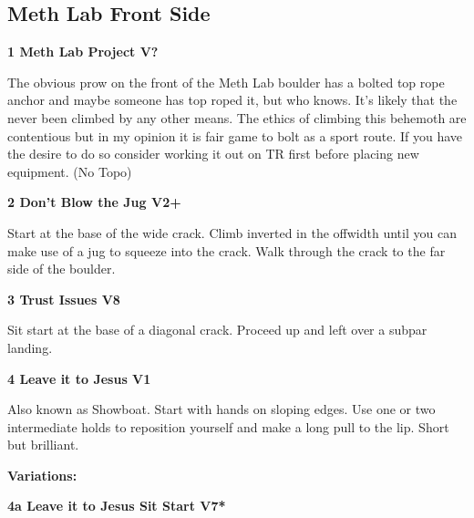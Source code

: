 \begin{multicols}{2}
	

			\subsection*{Meth Lab Front Side}\label{bf:Meth Lab Front Side}
						
					\label{rt:Meth Lab Project}
\colorbox{black!20}{
\parbox{0.95\linewidth}{
\textbf{
1 Meth Lab Project V?  \warn\warn\warn
}
}
}

					\begin{adjustwidth}{0.5cm}{}				
					The obvious prow on the front of the Meth Lab boulder has a bolted top rope anchor and maybe someone has top roped it, but who knows. It's likely that the never been climbed by any other means. The ethics of climbing this behemoth are contentious but in my opinion it is fair game to bolt as a sport route. If you have the desire to do so consider working it out on TR first before placing new equipment.
						\newline (No Topo) 
					\end{adjustwidth}
					\label{rt:Don't Blow the Jug}
\colorbox{green!20}{
\parbox{0.95\linewidth}{
\textbf{
2 Don't Blow the Jug V2+  \warn
}
}
}

					\begin{adjustwidth}{0.5cm}{}				
					Start at the base of the wide crack. Climb inverted in the offwidth until you can make use of a jug to squeeze into the crack. Walk through the crack to the far side of the boulder.
					\end{adjustwidth}
					\label{rt:Trust Issues}
\colorbox{Goldenrod!50}{
\parbox{0.95\linewidth}{
\textbf{
3 Trust Issues V8  \warn\warn
}
}
}

					\begin{adjustwidth}{0.5cm}{}				
					Sit start at the base of a diagonal crack. Proceed up and left over a subpar landing.
					\end{adjustwidth}
					\label{rt:Leave it to Jesus}
\colorbox{green!20}{
\parbox{0.95\linewidth}{
\textbf{
4 Leave it to Jesus V1  
}
}
}

					\begin{adjustwidth}{0.5cm}{}				
					Also known as Showboat. Start with hands on sloping edges. Use one or two intermediate holds to reposition yourself and make a long pull to the lip. Short but brilliant.
					\end{adjustwidth}
						\begin{adjustwidth}{0.5cm}{}				
						\textbf{Variations:} \newline
							\label{vr:Leave it to Jesus Sit Start}
\colorbox{Goldenrod!50}{
\parbox{0.95\linewidth}{
\textbf{
4a Leave it to Jesus Sit Start V7*  
}
}
}


\end{adjustwidth}
\end{multicols}
